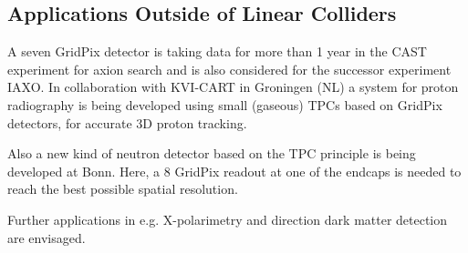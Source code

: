 \subsection{Applications Outside of Linear Colliders}
A seven GridPix detector is taking data for more than 1 year in the CAST
experiment for axion search and is also considered for the successor experiment IAXO.
In collaboration with KVI-CART in Groningen (NL) a system for proton radiography
is being developed using small (gaseous) TPCs based on GridPix detectors, for
accurate 3D proton tracking.

Also a new kind of neutron detector based on the TPC principle is being developed at Bonn. Here, a 8 GridPix readout at one of the endcaps is needed to reach the best possible spatial resolution.

Further applications in e.g. X-polarimetry and direction dark matter detection are envisaged.
